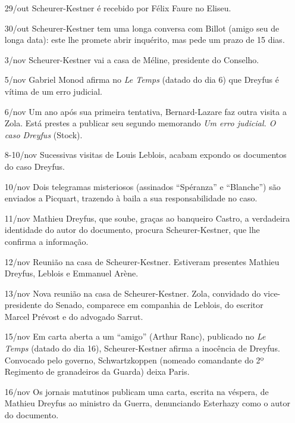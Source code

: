 \begin{itemize}
\item[29/out] Scheurer-Kestner é recebido por Félix Faure no Eliseu.

\item[30/out] Scheurer-Kestner tem uma longa conversa com Billot (amigo seu de
longa data): este lhe promete abrir inquérito, mas pede um prazo de 15 dias. 

\item[3/nov] Scheurer-Kestner vai a casa de Méline, presidente do Conselho.

\item[5/nov] Gabriel Monod afirma no \textit{Le Temps} (datado do dia 6) que
Dreyfus é vítima de um erro judicial.

\item[6/nov] Um ano após sua primeira tentativa, Bernard-Lazare faz outra
visita a Zola. Está prestes a publicar seu segundo memorando \textit{Um erro
judicial. O caso Dreyfus} (Stock).

\item[8-10/nov] Sucessivas visitas de Louis Leblois, acabam expondo os
documentos do caso Dreyfus.

\item[10/nov] Dois telegramas misteriosos (assinados ``Spéranza'' e
``Blanche'') são enviados a Picquart, trazendo à baila a sua responsabilidade
no caso.
 
\item[11/nov] Mathieu Dreyfus, que soube, graças ao banqueiro Castro, a
verdadeira identidade do autor do documento, procura Scheurer-Kestner, que lhe
confirma a informação.

\item[12/nov] Reunião na casa de Scheurer-Kestner. Estiveram presentes Mathieu
Dreyfus, Leblois e Emmanuel Arène.

\item[13/nov] Nova reunião na casa de Scheurer-Kestner. Zola, convidado do
vice-presidente do Senado, comparece em companhia de Leblois, do escritor
Marcel Prévost e do advogado Sarrut. 

\item[15/nov] Em carta aberta a um ``amigo'' (Arthur Ranc), publicado no
\textit{Le Temps} (datado do dia 16), Scheurer-Kestner afirma a inocência de
Dreyfus. Convocado pelo governo, Schwartzkoppen (nomeado comandante do 2º
Regimento de granadeiros da Guarda) deixa Paris.

\item[16/nov] Os jornais matutinos publicam uma carta, escrita na véspera, de
Mathieu Dreyfus ao ministro da Guerra, denunciando Esterhazy como o autor do
documento.


\end{itemize}

